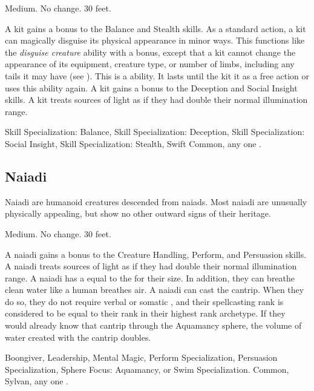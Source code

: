          Medium.
         No change.
         30 feet.
        \begin{itemize}
             A kit gains a  bonus to the Balance and Stealth skills.
             As a standard action, a kit can magically disguise its physical appearance in minor ways.
                This functions like the \textit{disguise creature} ability with a  bonus, except that a kit cannot change the appearance of its equipment, creature type, or number of limbs, including any tails it may have (see ).
                This is a  ability.
                It lasts until the kit  it as a free action or uses this ability again.
             A kit gains a  bonus to the Deception and Social Insight skills.
             A kit treats sources of light as if they had double their normal illumination range.
        \end{itemize}
         Skill Specialization: Balance, Skill Specialization: Deception, Skill Specialization: Social Insight, Skill Specialization: Stealth, Swift
         Common, any one .

    \subsection{Naiadi}

        Naiadi are humanoid creatures descended from naiads.
        Most naiadi are unusually physically appealing, but show no other outward signs of their heritage.

         Medium.
         No change.
         30 feet.
        \begin{itemize}
             A naiadi gains a  bonus to the Creature Handling, Perform, and Persuasion skills.
             A naiadi treats sources of light as if they had double their normal illumination range.
             A naiadi has a  equal to the  for their size.
                In addition, they can breathe clean water like a human breathes air.
             A naiadi can cast the  cantrip.
                When they do so, they do not require verbal or somatic , and their spellcasting rank is considered to be equal to their rank in their highest rank archetype.
                If they would already know that cantrip through the Aquamancy sphere, the volume of water created with the cantrip doubles.
        \end{itemize}
         Boongiver, Leadership, Mental Magic, Perform Specialization, Persuasion Specialization, Sphere Focus: Aquamancy, or Swim Specialization.
         Common, Sylvan, any one .

